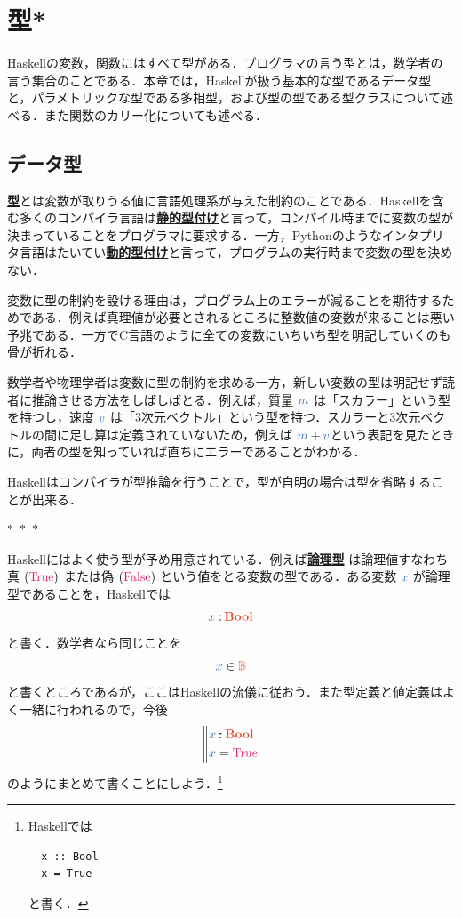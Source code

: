 \documentclass[a5paper,twoside,fleqn,draft]{jsbook}
\def\constantColor{WildStrawberry}
\def\varColor{NavyBlue}
\def\typeColor{RedOrange}
\newcommand{\separator}{\begin{center}$*$~$*$~$*$\end{center}}
\newcommand{\programminglanguage}[1]{\textsf{#1}}
\newcommand{\clang}{\programminglanguage{C}}
\newcommand{\haskell}{\programminglanguage{Haskell}}
\newcommand{\python}{\programminglanguage{Python}}
\newenvironment{leader}{\begingroup\gt}{\endgroup}
\newcommand{\keyword}[1]{{\underline{\textbf{#1}}}}
\newcommand{\mBrace}{\Vert}
\newcommand{\mSpecialConstant}[1]{\textcolor{\constantColor}{\textrm{#1}}}
\newcommand{\mFalse}{\mSpecialConstant{False}}
\newcommand{\mTrue}{\mSpecialConstant{True}}
\newcommand{\mVar}[1]{\textcolor{\varColor}{#1}}
\newcommand{\mMVar}{\mVar{m}}
\newcommand{\mVVar}{\mVar{v}}
\newcommand{\mXVar}{\mVar{x}}
\DeclareMathOperator{\mIn}{{:\!:}}
\newcommand{\mSpecialSet}[1]{\textcolor{\typeColor}{\mathbb{#1}}}
\newcommand{\mBSet}{\mSpecialSet{B}}
\newcommand{\mType}[1]{\textcolor{\typeColor}{\mathbf{#1}}}
\newcommand{\mBoolType}{\mType{Bool}}
\begin{document}
\chapter{型*}
\label{ch:type}

\begin{leader}
\haskell の変数，関数にはすべて型がある．プログラマの言う型とは，数学者の言う集合のことである．本章では，\haskell が扱う基本的な型であるデータ型と，パラメトリックな型である多相型，および型の型である型クラスについて述べる．また関数のカリー化についても述べる．
\end{leader}

\section{データ型}

\keyword{型}とは変数が取りうる値に言語処理系が与えた制約のことである．\haskell を含む多くのコンパイラ言語は\keyword{静的型付け}と言って，コンパイル時までに変数の型が決まっていることをプログラマに要求する．一方，\python のようなインタプリタ言語はたいてい\keyword{動的型付け}と言って，プログラムの実行時まで変数の型を決めない．

変数に型の制約を設ける理由は，プログラム上のエラーが減ることを期待するためである．例えば真理値が必要とされるところに整数値の変数が来ることは悪い予兆である．一方で\clang 言語のように全ての変数にいちいち型を明記していくのも骨が折れる．

数学者や物理学者は変数に型の制約を求める一方，新しい変数の型は明記せず読者に推論させる方法をしばしばとる．例えば，質量 $\mMVar$ は「スカラー」という型を持つし，速度 $\mVVar$ は「3次元ベクトル」という型を持つ．スカラーと3次元ベクトルの間に足し算は定義されていないため，例えば $\mMVar+\mVVar$という表記を見たときに，両者の型を知っていれば直ちにエラーであることがわかる．

\haskell はコンパイラが型推論を行うことで，型が自明の場合は型を省略することが出来る．

\separator

\haskell にはよく使う型が予め用意されている．例えば\keyword{論理型} は論理値すなわち真 $(\mTrue)$ または偽 $(\mFalse)$ という値をとる変数の型である．ある変数 $\mXVar$ が論理型であることを，\haskell では
\begin{equation}
  \mXVar
  \mIn\mBoolType
\end{equation}
と書く．数学者なら同じことを
\begin{equation}
  \mXVar
  \in\mBSet
\end{equation}
と書くところであるが，ここは\haskell の流儀に従おう．また型定義と値定義はよく一緒に行われるので，今後
\begin{equation}
  \left\mBrace
  \begin{aligned}
    \mXVar
    &\mIn\mBoolType\\
    \mXVar
    &=\mTrue
  \end{aligned}
  \right.
\end{equation}
のようにまとめて書くことにしよう．\footnote{\haskell では
\begin{verbatim}
  x :: Bool
  x = True
\end{verbatim}
と書く．}
\end{document}
